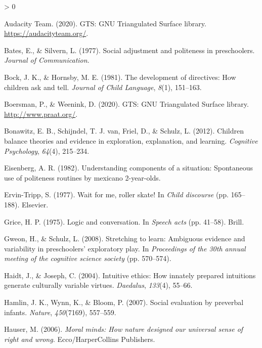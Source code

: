\documentclass[
  english,
  man,floatsintext]{apa6}
\newlength{\cslhangindent}
\newenvironment{CSLReferences}[2] %
 {%
  \setlength{\parindent}{0pt}
  \ifodd #1 \everypar{\setlength{\hangindent}{\cslhangindent}}\ignorespaces\fi
  \ifnum #2 > 0
  \setlength{\parskip}{#2\baselineskip}
  \fi
 }%
 {}
\begin{document}
\hypertarget{refs}{}
\begin{CSLReferences}{1}{0}
\leavevmode\hypertarget{ref-audacity2020}{}%
Audacity Team. (2020). {GTS}: {GNU} {Triangulated} {Surface} library. \url{https://audacityteam.org/}.

\leavevmode\hypertarget{ref-bates1977}{}%
Bates, E., \& Silvern, L. (1977). Social adjustment and politeness in preschoolers. \emph{Journal of Communication}.

\leavevmode\hypertarget{ref-bock1981}{}%
Bock, J. K., \& Hornsby, M. E. (1981). The development of directives: How children ask and tell. \emph{Journal of Child Language}, \emph{8}(1), 151--163.

\leavevmode\hypertarget{ref-boersman2020}{}%
Boersman, P., \& Weenink, D. (2020). {GTS}: {GNU} {Triangulated} {Surface} library. \url{http://www.praat.org/}.

\leavevmode\hypertarget{ref-bonawitz2012}{}%
Bonawitz, E. B., Schijndel, T. J. van, Friel, D., \& Schulz, L. (2012). Children balance theories and evidence in exploration, explanation, and learning. \emph{Cognitive Psychology}, \emph{64}(4), 215--234.

\leavevmode\hypertarget{ref-eisenberg1982}{}%
Eisenberg, A. R. (1982). Understanding components of a situation: Spontaneous use of politeness routines by mexicano 2-year-olds.

\leavevmode\hypertarget{ref-ervintripp1977}{}%
Ervin-Tripp, S. (1977). Wait for me, roller skate! In \emph{Child discourse} (pp. 165--188). Elsevier.

\leavevmode\hypertarget{ref-grice1975}{}%
Grice, H. P. (1975). Logic and conversation. In \emph{Speech acts} (pp. 41--58). Brill.

\leavevmode\hypertarget{ref-gweon2008}{}%
Gweon, H., \& Schulz, L. (2008). Stretching to learn: Ambiguous evidence and variability in preschoolers' exploratory play. In \emph{Proceedings of the 30th annual meeting of the cognitive science society} (pp. 570--574).

\leavevmode\hypertarget{ref-haidt2004}{}%
Haidt, J., \& Joseph, C. (2004). Intuitive ethics: How innately prepared intuitions generate culturally variable virtues. \emph{Daedalus}, \emph{133}(4), 55--66.

\leavevmode\hypertarget{ref-hamlin2007}{}%
Hamlin, J. K., Wynn, K., \& Bloom, P. (2007). Social evaluation by preverbal infants. \emph{Nature}, \emph{450}(7169), 557--559.

\leavevmode\hypertarget{ref-hauser2006}{}%
Hauser, M. (2006). \emph{Moral minds: How nature designed our universal sense of right and wrong.} Ecco/HarperCollins Publishers.


\end{CSLReferences}
\end{document}
